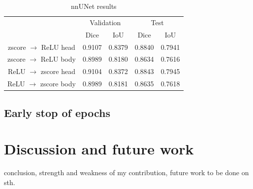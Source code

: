 \documentclass{article}
\begin{document}
\begin{table}
  \caption{nnUNet results}
  \label{results}
  \centering
  \begin{tabular}{ccccc}
    \toprule
    & \multicolumn{2}{c}{Validation} & \multicolumn{2}{c}{Test} \\
    \cmidrule(r){2-5}
    & Dice & IoU & Dice & IoU \\
    \midrule
    zscore \(\rightarrow\) ReLU head &0.9107&0.8379&0.8840&0.7941\\
    \cmidrule(r){1-1}
    zscore \(\rightarrow\) ReLU body &0.8989&0.8180&0.8634&0.7616\\
    \cmidrule(r){1-1}
    ReLU \(\rightarrow\) zscore head &0.9104&0.8372&0.8843&0.7945\\
    \cmidrule(r){1-1}
    ReLU \(\rightarrow\) zscore body &0.8989&0.8181&0.8635&0.7618\\
    \bottomrule
  \end{tabular}
\end{table}

\subsection{Early stop of epochs}



\section{Discussion and future work}

conclusion, strength and weakness of my contribution, future work to be done on sth.



\end{document}
